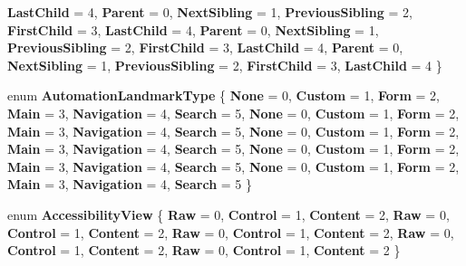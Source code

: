 \begin{DoxyCompactItemize}
{\bfseries Last\+Child} = 4, 
{\bfseries Parent} = 0, 
{\bfseries Next\+Sibling} = 1, 
\newline
{\bfseries Previous\+Sibling} = 2, 
{\bfseries First\+Child} = 3, 
{\bfseries Last\+Child} = 4, 
{\bfseries Parent} = 0, 
\newline
{\bfseries Next\+Sibling} = 1, 
{\bfseries Previous\+Sibling} = 2, 
{\bfseries First\+Child} = 3, 
{\bfseries Last\+Child} = 4, 
\newline
{\bfseries Parent} = 0, 
{\bfseries Next\+Sibling} = 1, 
{\bfseries Previous\+Sibling} = 2, 
{\bfseries First\+Child} = 3, 
\newline
{\bfseries Last\+Child} = 4
 \}
\item 
\mbox{\label{namespace_windows_1_1_u_i_1_1_xaml_1_1_automation_1_1_peers_a7841d4ce398126516a6081408b8e9c0d}} 
enum {\bfseries Automation\+Landmark\+Type} \{ \newline
{\bfseries None} = 0, 
{\bfseries Custom} = 1, 
{\bfseries Form} = 2, 
{\bfseries Main} = 3, 
\newline
{\bfseries Navigation} = 4, 
{\bfseries Search} = 5, 
{\bfseries None} = 0, 
{\bfseries Custom} = 1, 
\newline
{\bfseries Form} = 2, 
{\bfseries Main} = 3, 
{\bfseries Navigation} = 4, 
{\bfseries Search} = 5, 
\newline
{\bfseries None} = 0, 
{\bfseries Custom} = 1, 
{\bfseries Form} = 2, 
{\bfseries Main} = 3, 
\newline
{\bfseries Navigation} = 4, 
{\bfseries Search} = 5, 
{\bfseries None} = 0, 
{\bfseries Custom} = 1, 
\newline
{\bfseries Form} = 2, 
{\bfseries Main} = 3, 
{\bfseries Navigation} = 4, 
{\bfseries Search} = 5, 
\newline
{\bfseries None} = 0, 
{\bfseries Custom} = 1, 
{\bfseries Form} = 2, 
{\bfseries Main} = 3, 
\newline
{\bfseries Navigation} = 4, 
{\bfseries Search} = 5
 \}
\item 
\mbox{\label{namespace_windows_1_1_u_i_1_1_xaml_1_1_automation_1_1_peers_aaf97ef41301cdde06f4cd3f8213a5478}} 
enum {\bfseries Accessibility\+View} \{ \newline
{\bfseries Raw} = 0, 
{\bfseries Control} = 1, 
{\bfseries Content} = 2, 
{\bfseries Raw} = 0, 
\newline
{\bfseries Control} = 1, 
{\bfseries Content} = 2, 
{\bfseries Raw} = 0, 
{\bfseries Control} = 1, 
\newline
{\bfseries Content} = 2, 
{\bfseries Raw} = 0, 
{\bfseries Control} = 1, 
{\bfseries Content} = 2, 
\newline
{\bfseries Raw} = 0, 
{\bfseries Control} = 1, 
{\bfseries Content} = 2
 \}
\end{DoxyCompactItemize}
